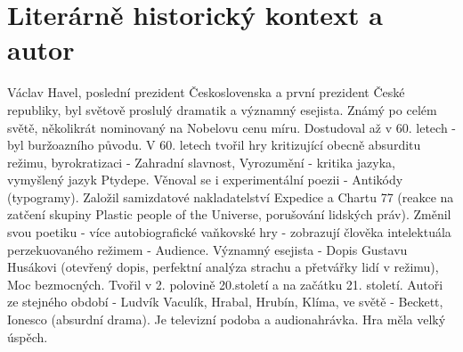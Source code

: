 \documentclass[11pt]{article}
\begin{document}
    \section*{Literárně historický kontext a autor}
    Václav Havel, poslední prezident Československa a první prezident České republiky, byl světově proslulý dramatik a významný esejista.
    Známý po celém světě, několikrát nominovaný na Nobelovu cenu míru.
    Dostudoval až v 60. letech - byl buržoazního původu.
    V 60. letech tvořil hry kritizující obecně absurditu režimu, byrokratizaci - Zahradní slavnost, Vyrozumění - kritika jazyka, vymyšlený jazyk Ptydepe. Věnoval se i experimentální poezii - Antikódy (typogramy).
    Založil samizdatové nakladatelství Expedice a Chartu 77 (reakce na zatčení skupiny Plastic people of the Universe, porušování lidských práv).
    Změnil svou poetiku - více autobiografické vaňkovské hry - zobrazují člověka intelektuála perzekuovaného režimem - Audience.
    Významný esejista - Dopis Gustavu Husákovi (otevřený dopis, perfektní analýza strachu a přetvářky lidí v režimu), Moc bezmocných.
    Tvořil v 2. polovině 20.století a na začátku 21. století.
    Autoři ze stejného období - Ludvík Vaculík, Hrabal, Hrubín, Klíma, ve světě - Beckett, Ionesco (absurdní drama).
    Je televizní podoba a audionahrávka. Hra měla velký úspěch.
\end{document}
